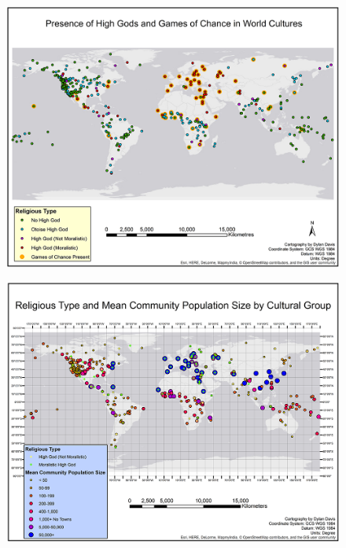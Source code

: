 \documentclass[%
	]{ijsra}
\begin{document}
\begin{figure} [!htb] %
	\includegraphics[width=\linewidth]{figures/Figure6_Davis_082016}
	\caption
	\centering
	\label{fig:Figure6_Davis_082016}
\end{figure}

\begin{figure} [!htb] %
	\includegraphics[width=\linewidth]{figures/Figure7_Davis_082016}
	\caption
	\centering
	\label{fig:Figure7_Davis_082016}
\end{figure}

\end{document}
